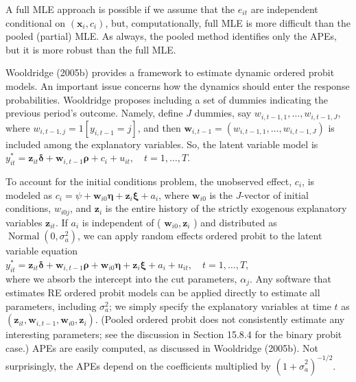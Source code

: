 \documentclass[10pt]{article}
\begin{document}
A full MLE approach is possible if we assume that the $e_{i t}$ are independent conditional on $\left(\mathbf{x}_{i}, c_{i}\right)$, but, computationally, full MLE is more difficult than the pooled (partial) MLE. As always, the pooled method identifies only the APEs, but it is more robust than the full MLE.

Wooldridge (2005b) provides a framework to estimate dynamic ordered probit models. An important issue concerns how the dynamics should enter the response probabilities. Wooldridge proposes including a set of dummies indicating the previous period's outcome. Namely, define $J$ dummies, say $w_{i, t-1,1}, \ldots, w_{i, t-1, J}$, where $w_{i, t-1, j}=1\left[y_{i, t-1}=j\right]$, and then $\mathbf{w}_{i, t-1}=\left(w_{i, t-1,1}, \ldots, w_{i, t-1, J}\right)$ is included among the explanatory variables. So, the latent variable model is\\
$y_{i t}^{*}=\mathbf{z}_{i t} \boldsymbol{\delta}+\mathbf{w}_{i, t-1} \boldsymbol{\rho}+c_{i}+u_{i t}, \quad t=1, \ldots, T$.

To account for the initial conditions problem, the unobserved effect, $c_{i}$, is modeled as $c_{i}=\psi+\mathbf{w}_{i 0} \boldsymbol{\eta}+\mathbf{z}_{i} \boldsymbol{\xi}+a_{i}$, where $\mathbf{w}_{i 0}$ is the $J$-vector of initial conditions, $w_{i 0 j}$, and $\mathbf{z}_{i}$ is the entire history of the strictly exogenous explanatory variables $\mathbf{z}_{i t}$. If $a_{i}$ is independent of ( $\mathbf{w}_{i 0}, \mathbf{z}_{i}$ ) and distributed as $\operatorname{Normal}\left(0, \sigma_{a}^{2}\right)$, we can apply random effects ordered probit to the latent variable equation\\
$y_{i t}^{*}=\mathbf{z}_{i t} \boldsymbol{\delta}+\mathbf{w}_{i, t-1} \boldsymbol{\rho}+\mathbf{w}_{i 0} \boldsymbol{\eta}+\mathbf{z}_{i} \boldsymbol{\xi}+a_{i}+u_{i t}, \quad t=1, \ldots, T$,\\
where we absorb the intercept into the cut parameters, $\alpha_{j}$. Any software that estimates RE ordered probit models can be applied directly to estimate all parameters, including $\sigma_{a}^{2}$; we simply specify the explanatory variables at time $t$ as $\left(\mathbf{z}_{i t}, \mathbf{w}_{i, t-1}, \mathbf{w}_{i 0}, \mathbf{z}_{i}\right)$. (Pooled ordered probit does not consistently estimate any interesting parameters; see the discussion in Section 15.8.4 for the binary probit case.) APEs are easily computed, as discussed in Wooldridge (2005b). Not surprisingly, the APEs depend on the coefficients multiplied by $\left(1+\hat{\sigma}_{a}^{2}\right)^{-1 / 2}$.
\end{document}
